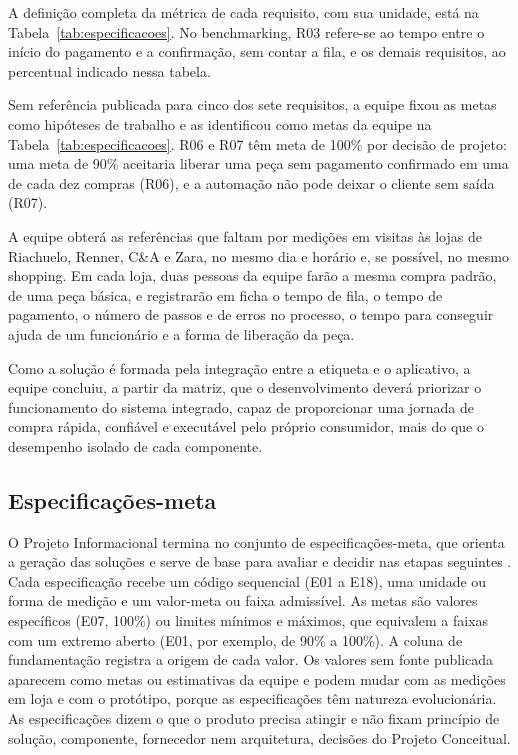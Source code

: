 A definição completa da métrica de cada requisito, com sua unidade, está na Tabela~\ref{tab:especificacoes}. No benchmarking, R03 refere-se ao tempo entre o início do pagamento e a confirmação, sem contar a fila, e os demais requisitos, ao percentual indicado nessa tabela.

Sem referência publicada para cinco dos sete requisitos, a equipe fixou as metas como hipóteses de trabalho e as identificou como metas da equipe na Tabela~\ref{tab:especificacoes}. R06 e R07 têm meta de 100\% por decisão de projeto: uma meta de 90\% aceitaria liberar uma peça sem pagamento confirmado em uma de cada dez compras (R06), e a automação não pode deixar o cliente sem saída (R07).

A equipe obterá as referências que faltam por medições em visitas às lojas de Riachuelo, Renner, C\&A e Zara, no mesmo dia e horário e, se possível, no mesmo shopping. Em cada loja, duas pessoas da equipe farão a mesma compra padrão, de uma peça básica, e registrarão em ficha o tempo de fila, o tempo de pagamento, o número de passos e de erros no processo, o tempo para conseguir ajuda de um funcionário e a forma de liberação da peça.

Como a solução é formada pela integração entre a etiqueta e o aplicativo, a equipe concluiu, a partir da matriz, que o desenvolvimento deverá priorizar o funcionamento do sistema integrado, capaz de proporcionar uma jornada de compra rápida, confiável e executável pelo próprio consumidor, mais do que o desempenho isolado de cada componente.

\subsection{Especificações-meta}
\label{subsec:especificacoes_meta}

O Projeto Informacional termina no conjunto de especificações-meta, que orienta a geração das soluções e serve de base para avaliar e decidir nas etapas seguintes \cite{rozenfeld2006gestao}. Cada especificação recebe um código sequencial (E01 a E18), uma unidade ou forma de medição e um valor-meta ou faixa admissível. As metas são valores específicos (E07, 100\%) ou limites mínimos e máximos, que equivalem a faixas com um extremo aberto (E01, por exemplo, de 90\% a 100\%). A coluna de fundamentação registra a origem de cada valor. Os valores sem fonte publicada aparecem como metas ou estimativas da equipe e podem mudar com as medições em loja e com o protótipo, porque as especificações têm natureza evolucionária. As especificações dizem o que o produto precisa atingir e não fixam princípio de solução, componente, fornecedor nem arquitetura, decisões do Projeto Conceitual.

